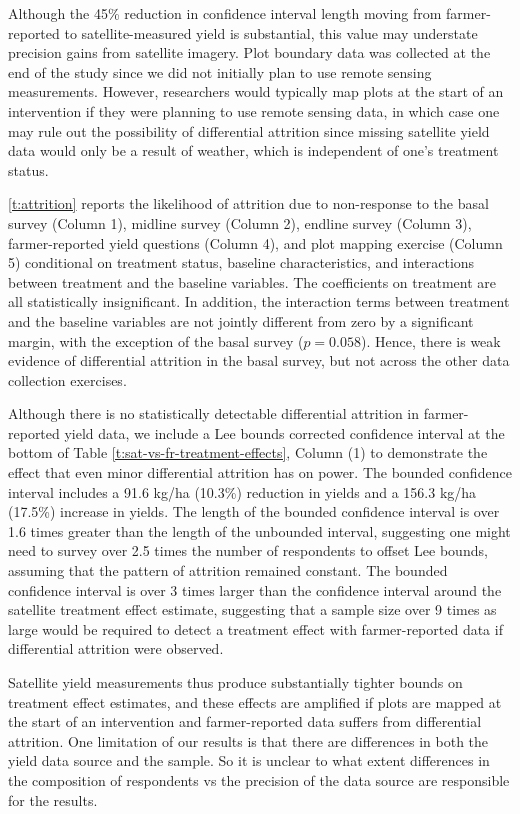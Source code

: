 \documentclass{article}
\begin{document}
Although the 45\% reduction in confidence interval length moving from farmer-reported to satellite-measured yield is substantial, this value may understate precision gains from satellite imagery. Plot boundary data was collected at the end of the study since we did not initially plan to use remote sensing measurements. However, researchers would typically map plots at the start of an intervention if they were planning to use remote sensing data, in which case one may rule out the possibility of differential attrition since missing satellite yield data would only be a result of weather, which is independent of one’s treatment status. 

\ref{t:attrition} reports the likelihood of attrition due to non-response to the basal survey (Column 1), midline survey (Column 2), endline survey (Column 3), farmer-reported yield questions (Column 4), and plot mapping exercise (Column 5) conditional on treatment status, baseline characteristics, and interactions between treatment and the baseline variables. The coefficients on treatment are all statistically insignificant. In addition, the interaction terms between treatment and the baseline variables are not jointly different from zero by a significant margin, with the exception of the basal survey ($p=0.058$). Hence, there is weak evidence of differential attrition in the basal survey, but not across the other data collection exercises. 

Although there is no statistically detectable differential attrition in farmer-reported yield data, we include a Lee bounds corrected confidence interval at the bottom of Table \ref{t:sat-vs-fr-treatment-effects}, Column (1) to demonstrate the effect that even minor differential attrition has on power. The bounded confidence interval includes a 91.6 kg/ha (10.3\%) reduction in yields and a 156.3 kg/ha (17.5\%) increase in yields. The length of the bounded confidence interval is over 1.6 times greater than the length of the unbounded interval, suggesting one might need to survey over 2.5 times the number of respondents to offset Lee bounds, assuming that the pattern of attrition remained constant. The bounded confidence interval is over 3 times larger than the confidence interval around the satellite treatment effect estimate, suggesting that a sample size over 9 times as large would be required to detect a treatment effect with farmer-reported data if differential attrition were observed. 

Satellite yield measurements thus produce substantially tighter bounds on treatment effect estimates, and these effects are amplified if plots are mapped at the start of an intervention and farmer-reported data suffers from differential attrition. One limitation of our results is that there are differences in both the yield data source and the sample. So it is unclear to what extent differences in the composition of respondents vs the precision of the data source are responsible for the results. 
\end{document}
